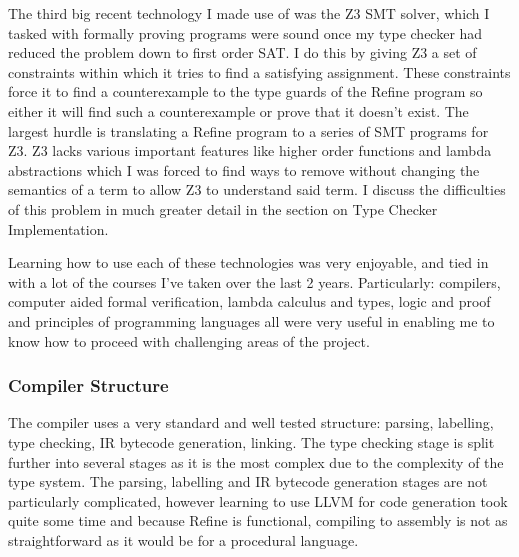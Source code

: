 The third big recent technology I made use of was the Z3 SMT solver, which I tasked with formally
proving programs were sound once my type checker had reduced the problem down to first order SAT.
I do this by giving Z3 a set of constraints within which it tries to find a satisfying assignment.
These constraints force it to find a counterexample to the type guards of the Refine program so
either it will find such a counterexample or prove that it doesn't exist.
The largest hurdle is translating a Refine program to a series of SMT programs for Z3.
Z3 lacks various important features like higher order functions and lambda abstractions which I
was forced to find ways to remove without changing the semantics of a term to allow Z3 to understand
said term.
I discuss the difficulties of this problem in much greater detail in the section on
Type Checker Implementation.

\bigskip

Learning how to use each of these technologies was very enjoyable, and tied in with a lot of the
courses I've taken over the last 2 years.
Particularly: compilers, computer aided formal verification, lambda calculus and types, logic and proof
and principles of programming languages all were very useful in enabling me to know how to proceed
with challenging areas of the project.

\subsubsection{Compiler Structure}

The compiler uses a very standard and well tested structure: parsing, labelling, type checking,
IR bytecode generation, linking.
The type checking stage is split further into several stages as it is the most complex due to the
complexity of the type system.
The parsing, labelling and IR bytecode generation stages are not particularly complicated, however
learning to use LLVM for code generation took quite some time and because Refine is functional,
compiling to assembly is not as straightforward as it would be for a procedural language.
